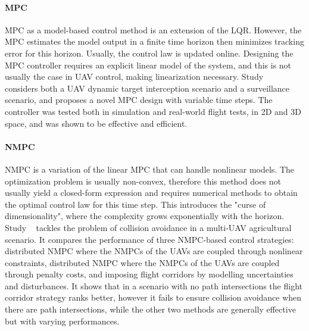 \paragraph*{MPC}
\gls{MPC} as a model-based control method is an extension of the LQR. However, the MPC estimates the model output in a finite time horizon then minimizes tracking error for this horizon. Usually, the control law is updated online. Designing the MPC controller requires an explicit linear model of the system, and this is not usually the case in UAV control, making linearization necessary. Study ~\cite{AtharvaG} considers both a UAV dynamic target interception scenario and a surveillance scenario, and proposes a novel MPC design with variable time steps. The controller was tested both in simulation and real-world flight tests, in 2D and 3D space, and was shown to be effective and efficient. 

\paragraph*{NMPC}
\gls{NMPC} is a variation of the linear MPC that can handle nonlinear models. The optimization problem is usually non-convex, therefore this method does not usually yield a closed-form expression and requires numerical methods to obtain the optimal control law for this time step. This introduces the "curse of dimensionality", where the complexity grows exponentially with the horizon. Study ~\cite{DoraN} tackles the problem of collision avoidance in a multi-UAV agricultural scenario. It compares the performance of three NMPC-based control strategies: distributed NMPC where the NMPCs of the UAVs are coupled through nonlinear constraints, distributed NMPC where the NMPCs of the UAVs are coupled through penalty costs, and imposing flight corridors by modelling uncertainties and disturbances. It shows that in a scenario with no path intersections the flight corridor strategy ranks better, however it fails to ensure collision avoidance when there are path intersections, while the other two methods are generally effective but with varying performances.

